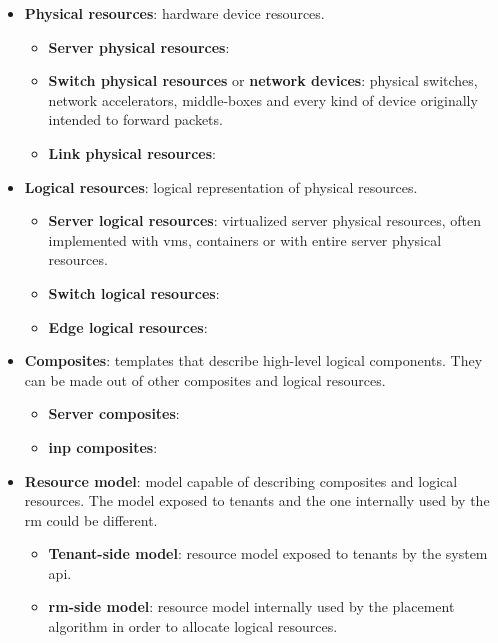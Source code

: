 \begin{itemize}
    \item \textbf{Physical resources}:
    hardware device resources.
    
    \begin{itemize}
        \item \textbf{Server physical resources}:
        
        \item \textbf{Switch physical resources} or \textbf{network devices}:
        physical switches, network accelerators, middle-boxes and every kind of device originally intended to forward packets.
        
        \item \textbf{Link physical resources}:
    \end{itemize}
    
    \item \textbf{Logical resources}:
    logical representation of physical resources.
    
    \begin{itemize}
        \item \textbf{Server logical resources}:
        virtualized server physical resources, often implemented with \glspl{vm}, containers or with entire server physical resources.
        
        \item \textbf{Switch logical resources}:
        
        \item \textbf{Edge logical resources}:
    \end{itemize}
    
    \item \textbf{Composites}:
    templates that describe high-level logical components.
    They can be made out of other composites and logical resources.
    
    \begin{itemize}
        \item \textbf{Server composites}:
        
        \item \textbf{\gls{inp} composites}:
    \end{itemize}
    
    \item \textbf{Resource model}:
    model capable of describing composites and logical resources.
    The model exposed to tenants and the one internally used by the \gls{rm} could be different.
    
    \begin{itemize}
        \item \textbf{Tenant-side model}:
        resource model exposed to tenants by the system \gls{api}.
        
        \item \textbf{\gls{rm}-side model}:
        resource model internally used by the placement algorithm in order to allocate logical resources.
    \end{itemize}
\end{itemize}